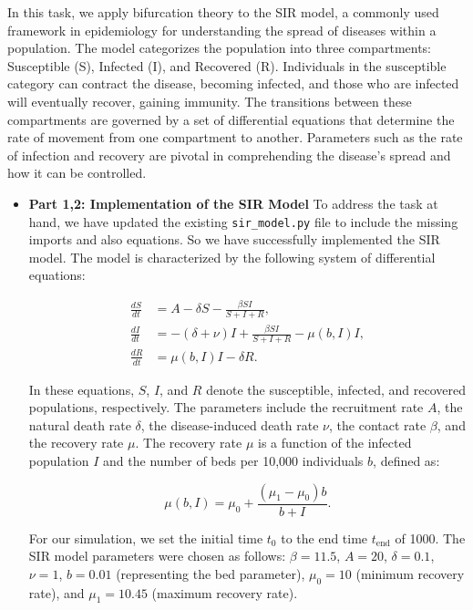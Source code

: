 In this task, we apply bifurcation theory to the SIR model, a commonly used framework in epidemiology for understanding the spread of diseases within a population. The model categorizes the population into three compartments: Susceptible (S), Infected (I), and Recovered (R). Individuals in the susceptible category can contract the disease, becoming infected, and those who are infected will eventually recover, gaining immunity. The transitions between these compartments are governed by a set of differential equations that determine the rate of movement from one compartment to another. Parameters such as the rate of infection and recovery are pivotal in comprehending the disease's spread and how it can be controlled.

\begin{itemize}
\item \textbf{Part 1,2: Implementation of the SIR Model}
To address the task at hand, we have updated the existing \texttt{sir\_model.py} file to include the missing imports and also equations. So we have successfully implemented the SIR model. The model is characterized by the following system of differential equations:

\begin{align}
\frac{dS}{dt} &= A - \delta S - \frac{\beta SI}{S + I + R}, \\
\frac{dI}{dt} &= -(\delta + \nu)I + \frac{\beta SI}{S + I + R} - \mu(b, I)I, \\
\frac{dR}{dt} &= \mu(b, I)I - \delta R.
\end{align}

In these equations, \( S \), \( I \), and \( R \) denote the susceptible, infected, and recovered populations, respectively. The parameters include the recruitment rate \( A \), the natural death rate \( \delta \), the disease-induced death rate \( \nu \), the contact rate \( \beta \), and the recovery rate \( \mu \). The recovery rate \( \mu \) is a function of the infected population \( I \) and the number of beds per 10,000 individuals \( b \), defined as:

\begin{equation}
\mu(b, I) = \mu_0 + \frac{(\mu_1 - \mu_0)b}{b + I}.
\end{equation}

For our simulation, we set the initial time \( t_0 \) to the end time \( t_{\text{end}} \) of 1000. The SIR model parameters were chosen as follows: \( \beta = 11.5 \), \( A = 20 \), \( \delta = 0.1 \), \( \nu = 1 \), \( b = 0.01 \) (representing the bed parameter), \( \mu_0 = 10 \) (minimum recovery rate), and \( \mu_1 = 10.45 \) (maximum recovery rate).


\end{itemize}

